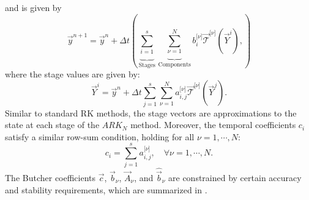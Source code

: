 \documentclass{article}
\begin{document}
and is given by
\begin{equation}
	\vec{y}^{n+1} = \vec{y}^n + \Delta t\left(
	\underbrace{\sum_{i=1}^{s}}_{\text{Stages}}
	\underbrace{\sum_{\nu=1}^{N}}_{\text{Components}}
	b_i^{\lbrack \nu \rbrack} \vec{\mathcal{T}}^{\lbrack \nu\rbrack}(\vec{Y}^i),
	\right)
\end{equation}
where the stage values are given by:
\begin{equation}
	\vec{Y}^i = \vec{y}^n + \Delta t \sum_{j=1}^{s} \sum_{\nu = 1}^{N} a_{i,j}^{\lbrack \nu \rbrack}
	\vec{\mathcal{T}}^{\lbrack \nu\rbrack}(\vec{Y}^j).
\end{equation}
Similar to standard RK methods, the stage vectors are approximations to the state at each stage
of the $ARK_N$ method. Moreover, the temporal coefficients $c_i$ satisfy a similar
row-sum condition, holding for all $\nu = 1, \cdots, N$:
\begin{equation}
	c_i = \sum_{j=1}^{s} a_{i, j}^{\lbrack \nu \rbrack}, \quad \forall \nu = 1, \cdots, N.
\end{equation}
The Butcher coefficients $\vec{c}$, $\vec{b}_{\nu}$, $\vec{A}_{\nu}$, and $\widehat{\vec{b}}_{\nu}$
are constrained by certain accuracy and stability requirements, which are summarized in
\cite{kennedy2001additive}.
\end{document}
